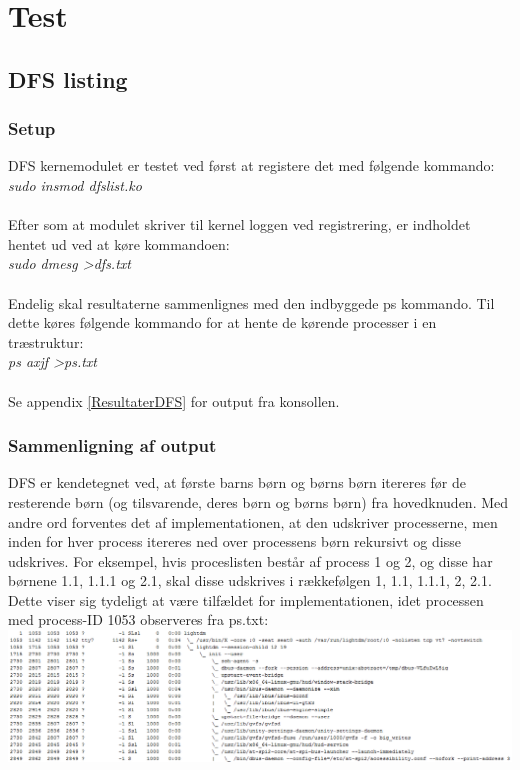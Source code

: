 \chapter{Test}

\section{DFS listing}
\subsection{Setup}
DFS kernemodulet er testet ved først at registere det med følgende kommando:\\
\textit{sudo insmod dfslist.ko}
\\
\\
Efter som at modulet skriver til kernel loggen ved registrering, er indholdet hentet ud ved at køre kommandoen:\\
\textit{sudo dmesg \textgreater dfs.txt}
\\
\\
Endelig skal resultaterne sammenlignes med den indbyggede ps kommando. Til dette køres følgende kommando for at hente de kørende processer i en træstruktur:\\
\textit{ps axjf \textgreater ps.txt}
\\
\\
Se appendix \ref{ResultaterDFS} for output fra konsollen.

\subsection{Sammenligning af output}
DFS er kendetegnet ved, at første barns børn og børns børn itereres før de resterende børn (og tilsvarende, deres børn og børns børn) fra hovedknuden. Med andre ord forventes det af implementationen, at den udskriver processerne, men inden for hver process itereres ned over processens børn rekursivt og disse udskrives. For eksempel, hvis proceslisten består af process 1 og 2, og disse har børnene 1.1, 1.1.1 og 2.1, skal disse udskrives i rækkefølgen 1, 1.1, 1.1.1, 2, 2.1.\\

Dette viser sig tydeligt at være tilfældet for implementationen, idet processen med process-ID 1053 observeres fra ps.txt:\\
\includegraphics[width=\textwidth]{Testing/DFS1.png}

